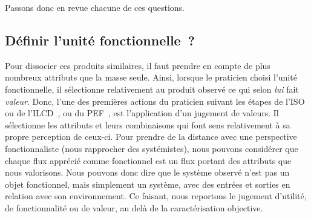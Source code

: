 Passons donc en revue chacune de ces questions.


\subsection{Définir l'unité fonctionnelle~?}


Pour dissocier ces produits similaires, il faut prendre en compte de plus nombreux attributs que la masse seule.
Ainsi, lorsque le praticien choisi l'unité fonctionnelle, il sélectionne relativement au produit observé ce qui selon \emph{lui} fait \emph{valeur}.
Donc, l'une des premières actions du praticien suivant les étapes de l'ISO ou de l'ILCD~\cite[]{european_commission_ilcd_2010}, ou du PEF~\cite{commission_europeenne_commission_2013}, est l'application d'un jugement de valeurs.
Il sélectionne les attributs et leurs combinaisons qui font sens relativement à sa propre perception de ceux-ci.
Pour prendre de la distance avec une perspective fonctionnaliste (nous rapprocher des systémistes), nous pouvons considérer que chaque flux apprécié comme fonctionnel est un flux portant des attributs que nous valorisons.
Nous pouvons donc dire que le système observé n'est pas un objet fonctionnel, mais simplement un système, avec des entrées et sorties en relation avec son environnement.
Ce faisant, nous reportons le jugement d'utilité, de fonctionnalité ou de valeur, au delà de la caractérisation objective.


